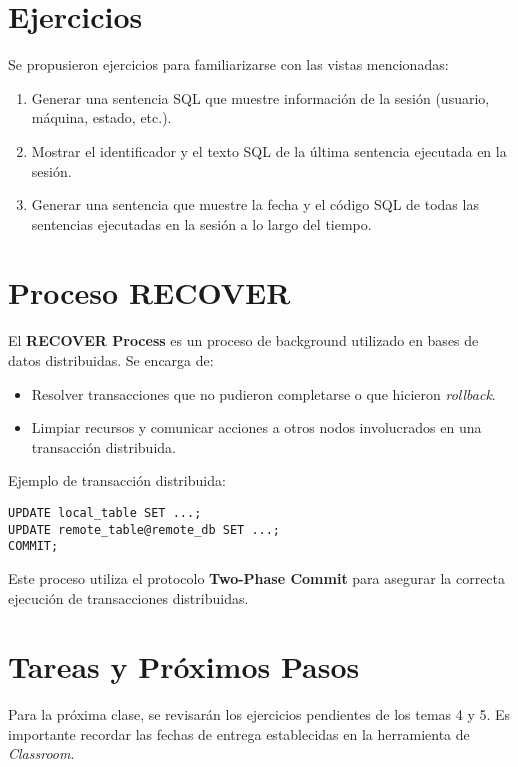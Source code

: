 \documentclass{article}
\begin{document}
\section{Ejercicios}
Se propusieron ejercicios para familiarizarse con las vistas mencionadas:
\begin{enumerate}
    \item Generar una sentencia SQL que muestre información de la sesión (usuario, máquina, estado, etc.).
    \item Mostrar el identificador y el texto SQL de la última sentencia ejecutada en la sesión.
    \item Generar una sentencia que muestre la fecha y el código SQL de todas las sentencias ejecutadas en la sesión a lo largo del tiempo.
\end{enumerate}

\section{Proceso RECOVER}
El \textbf{RECOVER Process} es un proceso de background utilizado en bases de datos distribuidas. Se encarga de:
\begin{itemize}
    \item Resolver transacciones que no pudieron completarse o que hicieron \textit{rollback}.
    \item Limpiar recursos y comunicar acciones a otros nodos involucrados en una transacción distribuida.
\end{itemize}

Ejemplo de transacción distribuida:
\begin{verbatim}
UPDATE local_table SET ...;
UPDATE remote_table@remote_db SET ...;
COMMIT;
\end{verbatim}

Este proceso utiliza el protocolo \textbf{Two-Phase Commit} para asegurar la correcta ejecución de transacciones distribuidas.

\section{Tareas y Próximos Pasos}
Para la próxima clase, se revisarán los ejercicios pendientes de los temas 4 y 5. Es importante recordar las fechas de entrega establecidas en la herramienta de \textit{Classroom}.
\end{document}

